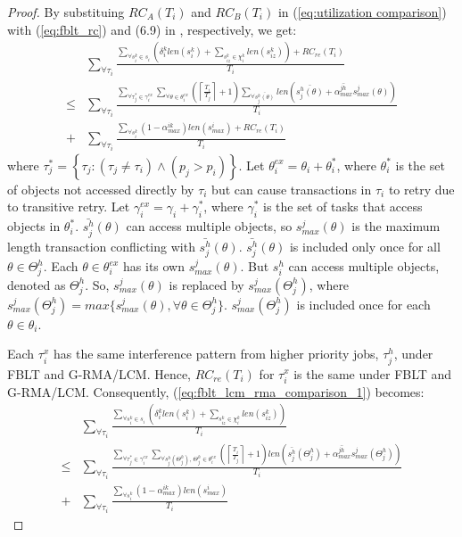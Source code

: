 \documentclass[prodmode,acmtecs]{acmsmall}
\begin{document}
\begin{proof}
By substituing $RC_{A}(T_{i})$ and $RC_{B}(T_{i})$ in (\ref{eq:utilization comparison})
with (\ref{eq:fblt_rc}) and (6.9) in \cite{shambake_phd_proposal}, respectively, we get:
\begin{eqnarray}
 & \sum_{\forall\tau_{i}}\frac{\sum_{\forall s_{i}^{k}\in s_{i}}\left(\delta_i^klen(s_{i}^{k})+\sum_{s_{iz}^{k}\in\chi_{i}^{k}}len(s_{iz}^{k})\right)+RC_{re}(T_{i})}{T_{i}}\label{eq:fblt_lcm_rma_comparison_1}\\
\le & \sum_{\forall\tau_{i}}\frac{\sum_{\forall\tau_{j}^{*}\in\gamma_{i}^{ex}}\sum_{\forall\theta\in\theta_{i}^{ex}}\left(\left\lceil \frac{T_{i}}{T_{j}}\right\rceil +1\right)\sum_{\forall\bar{s_{j}^{h}(\theta)}}len\left(\bar{s_{j}^{h}(\theta)}+\bar{\alpha_{max}^{jh}}s_{max}^{j}(\theta)\right)}{T_{i}}\nonumber \\
+ & \sum_{\forall\tau_{i}}\frac{\sum_{\forall s_{i}^{k}}\left(1-\alpha_{max}^{ik}\right)len(s_{max}^{i})+RC_{re}(T_{i})}{T_{i}}\nonumber 
\end{eqnarray}
where $\tau_{j}^{*}=\left\{ \tau_{j}:\left(\tau_{j}\ne\tau_{i}\right)\wedge\left(p_{j}>p_{i}\right)\right\} $.
Let $\theta_{i}^{ex}=\theta_{i}+\theta_{i}^{*}$, where $\theta_{i}^{*}$
is the set of objects not accessed directly by $\tau_{i}$ but can
cause transactions in $\tau_{i}$ to retry due to transitive retry.
Let $\gamma_{i}^{ex}=\gamma_{i}+\gamma_{i}^{*}$, where $\gamma_{i}^{*}$
is the set of tasks that access objects in $\theta_{i}^{*}$. $\bar{s_{j}^{h}}(\theta)$
can access multiple objects, so $s_{max}^{j}(\theta)$ is the maximum
length transaction conflicting with $\bar{s_{j}^{h}}(\theta)$. $\bar{s_{j}^{h}}(\theta)$ is included only once for all $\theta \in \Theta_j^h$. Each $\theta \in \theta_i^{ex}$ has its own $s_{max}^j(\theta)$. But $s_i^h$ can access multiple objects, denoted as $\Theta_j^h$. So, $s_{max}^j(\theta)$ is replaced by $s_{max}^j(\Theta_j^h)$, where $s_{max}^j(\Theta_j^h)=max\{s_{max}^j(\theta),\forall \theta \in \Theta_j^h\}$. $s_{max}^j(\Theta_j^h)$ is included once for each $\theta \in \theta_i$. 


Each $\tau_i^x$ has the same interference pattern from higher priority jobs, $\tau_j^h$, under FBLT and G-RMA/LCM. Hence, $RC_{re}(T_i)$ for $\tau_i^x$ is the same under FBLT and G-RMA/LCM. Consequently, (\ref{eq:fblt_lcm_rma_comparison_1}) becomes: 
\begin{eqnarray}
 & \sum_{\forall\tau_{i}}\frac{\sum_{\forall s_{i}^{k}\in s_{i}}\left(\delta_i^klen(s_{i}^{k})+\sum_{s_{iz}^{k}\in\chi_{i}^{k}}len(s_{iz}^{k})\right)}{T_{i}}\label{eq:fblt_lcm_rma_comparison_2}\\
\le & \sum_{\forall\tau_{i}}\frac{\sum_{\forall\tau_{j}^{*}\in\gamma_{i}^{ex}}\sum_
{\forall s_j^h(\Theta_j^h),\,\Theta_j^h\in\theta_{i}^{ex}}\left(\left\lceil \frac{T_{i}}{T_{j}}\right\rceil +1\right)len\left(\bar{s_{j}^{h}}(\Theta_j^h)+\bar{\alpha_{max}^{jh}}s_{max}^{j}(\Theta_j^h)\right)}{T_{i}}\nonumber \\
+ & \sum_{\forall\tau_{i}}\frac{\sum_{\forall s_{i}^{k}}\left(1-\alpha_{max}^{ik}\right)len(s_{max}^{i})}{T_{i}}\nonumber 
\end{eqnarray}


\end{proof}
\end{document}

